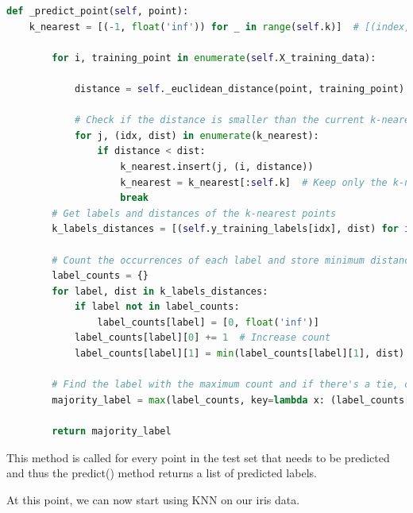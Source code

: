 \documentclass[letterpaper,10pt]{article}
\begin{document}
\begin{lstlisting}[language=Python, caption=knn.py - \_predict\_point()]
def _predict_point(self, point):
    k_nearest = [(-1, float('inf')) for _ in range(self.k)]  # [(index, distance), ...]

        for i, training_point in enumerate(self.X_training_data):

            distance = self._euclidean_distance(point, training_point)
            
            # Check if the distance is smaller than the current k-nearest distances
            for j, (idx, dist) in enumerate(k_nearest):
                if distance < dist:
                    k_nearest.insert(j, (i, distance))
                    k_nearest = k_nearest[:self.k]  # Keep only the k-nearest distances
                    break
        # Get labels and distances of the k-nearest points
        k_labels_distances = [(self.y_training_labels[idx], dist) for idx, dist in k_nearest]

        # Count the occurrences of each label and store minimum distance for each label
        label_counts = {}
        for label, dist in k_labels_distances:
            if label not in label_counts:
                label_counts[label] = [0, float('inf')]
            label_counts[label][0] += 1  # Increase count
            label_counts[label][1] = min(label_counts[label][1], dist)  # Store the minimum distance

        # Find the label with the maximum count and if there's a tie, choose the one with the smallest distance
        majority_label = max(label_counts, key=lambda x: (label_counts[x][0], -label_counts[x][1]))

        return majority_label

\end{lstlisting}

This method is called for every point in the test set that needs to be predicted and thus the predict() method returns a list of predicted labels. \par 
At this point, we can now start using KNN on our iris data. \par
\end{document}
